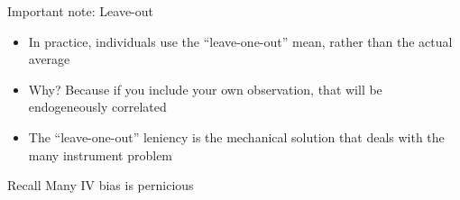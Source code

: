 \documentclass[notes,11pt, aspectratio=169]{beamer}
\begin{document}
  \begin{frame}{ Important note: Leave-out}
    \begin{itemize}
    \item In practice, individuals use the ``leave-one-out'' mean,
      rather than the actual average
    \item Why? Because if you include your own observation, that will
      be endogeneously correlated
    \item The ``leave-one-out'' leniency is the mechanical solution
      that deals with the many instrument problem
    \end{itemize}
  \end{frame}

  \begin{frame}{ Recall Many IV bias is pernicious}
  \end{frame}
  
\end{document}
